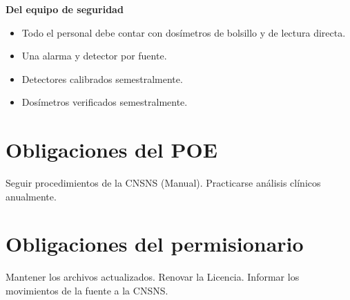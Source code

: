 \textbf{Del equipo de seguridad}

    \begin{itemize}
        \item Todo el personal debe contar con dosímetros de bolsillo y de lectura directa.
        \item Una alarma y detector por fuente.
        \item Detectores calibrados semestralmente.
        \item Dosímetros verificados semestralmente.
    \end{itemize}


\section*{Obligaciones del POE}

Seguir procedimientos de la CNSNS (Manual).
Practicarse análisis clínicos anualmente.

\section*{Obligaciones del permisionario}

Mantener los archivos actualizados.
Renovar la Licencia.
Informar los movimientos de la fuente a la CNSNS.


